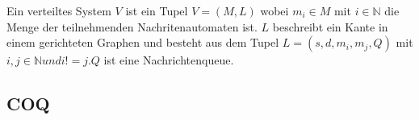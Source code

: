 \begin{defi}
  Ein verteiltes System $V$ ist ein Tupel $V=(M,L)$ wobei $m_i\in M$ mit $i\in
  \mathbb{N}$ die Menge der teilnehmenden Nachritenautomaten ist. $L$ beschreibt
  ein Kante in einem gerichteten Graphen und besteht aus dem Tupel $L=(s,d,m_i,m_j,Q)$
  mit $i,j\in \mathbb{N} und i!= j.Q$ ist eine Nachrichtenqueue.
\end{defi}

\subsection{COQ}


